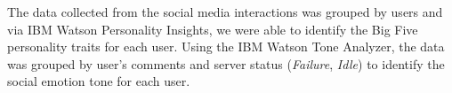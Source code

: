 \documentclass[graybox]{svmult}
\begin{document}
{The data collected from the social media interactions was grouped by
users and via IBM Watson Personality Insights, we were able to
identify the Big Five personality traits for each user. Using the IBM
Watson Tone Analyzer, the data was grouped by user's comments and
server status ({\emph{Failure}}, {\emph{Idle}}) to identify the social
emotion tone for each user.


}
\end{document}
